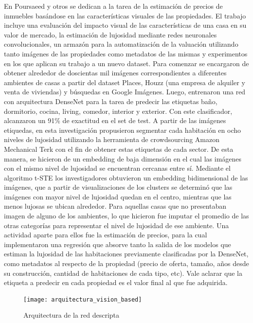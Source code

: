 En \cite{vision_based_real_estate_price_estimation} Poursaeed y otros se dedican a la tarea de la estimación de precios de inmuebles basándose en las características visuales de las propiedades. El trabajo incluye una evaluación del impacto visual de las características de una casa en su valor de mercado, la estimación de lujosidad mediante redes neuronales convolucionales, un armazón para la automatización de la valuación utilizando tanto imágenes de las propiedades como metadatos de las mismas y experimentos en los que aplican su trabajo a un nuevo dataset.
Para comenzar se encargaron de obtener alrededor de doscientas mil imágenes correspondientes a diferentes ambientes de casas a partir del dataset Places, Houzz (una empresa de alquiler y venta de viviendas) y búsquedas en Google Imágenes. Luego, entrenaron una red con arquitectura DenseNet para la tarea de predecir las etiquetas baño, dormitorio, cocina, living, comedor, interior y exterior. Con este clasificador, alcanzaron un 91\% de exactitud en el set de test.
A partir de las imágenes etiquedas, en esta investigación propusieron segmentar cada habitación en ocho niveles de lujosidad utilizando la herramienta de crowdsourcing Amazon Mechanical Terk con el fin de obtener estas etiquetas de cada sector. De esta manera, se hicieron de un embedding de baja dimensión en el cual las imágenes con el mismo nivel de lujosidad se encuentran cercanas entre sí. Mediante el algoritmo t-STE los investigadores obtuvieron un embedding bidimensional de las imágenes, que a partir de visualizaciones de los clusters se determinó que las imágenes con mayor nivel de lujosidad quedan en el centro, mientras que las menos lujosas se ubican alrededor. Para aquellas casas que no presentaban imagen de alguno de los ambientes, lo que hicieron fue imputar el promedio de las otras categorías para representar el nivel de lujosidad de ese ambiente.
Una actividad aparte para ellos fue la estimación de precios, para la cual implementaron una regresión que absorve tanto la salida de los modelos que estiman la lujosidad de las habitaciones previamente clasificadas por la DenseNet, como metadatos al respecto de la propiedad (precio de oferta, tamaño, años desde su construcción, cantidad de habitaciones de cada tipo, etc). Vale aclarar que la etiqueta a predecir en cada propiedad es el valor final al que fue adquirida.
\begin{figure}[h!]
	\centering
	\texttt{[image: arquitectura\_vision\_based]}
	\caption[Vision Based Architecture]{Arquitectura de la red descripta}
	\label{fig:arquitecturavisionbased}
\end{figure}

